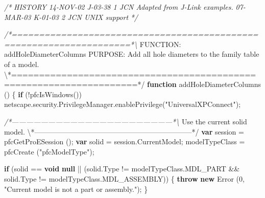 \documentclass[]{article}
\newenvironment{Shaded}{}{}
\newcommand{\KeywordTok}[1]{\textcolor[rgb]{0.00,0.44,0.13}{\textbf{{#1}}}}
\newcommand{\DecValTok}[1]{\textcolor[rgb]{0.25,0.63,0.44}{{#1}}}
\newcommand{\StringTok}[1]{\textcolor[rgb]{0.25,0.44,0.63}{{#1}}}
\newcommand{\CommentTok}[1]{\textcolor[rgb]{0.38,0.63,0.69}{\textit{{#1}}}}
\newcommand{\OtherTok}[1]{\textcolor[rgb]{0.00,0.44,0.13}{{#1}}}
\newcommand{\FunctionTok}[1]{\textcolor[rgb]{0.02,0.16,0.49}{{#1}}}
\newcommand{\NormalTok}[1]{{#1}}
\begin{document}
\begin{Shaded}
\begin{Highlighting}[]
\CommentTok{/*}
\CommentTok{   HISTORY}
\CommentTok{   }
\CommentTok{14-NOV-02   J-03-38   $$1   JCN      Adapted from J-Link examples.}
\CommentTok{07-MAR-03   K-01-03   $$2   JCN      UNIX support}
\CommentTok{*/}

\CommentTok{/*====================================================================*\textbackslash{}}
\NormalTok{FUNCTION: addHoleDiameterColumns}
\NormalTok{PURPOSE:  Add all hole diameters to the family table of a }\OtherTok{model}\NormalTok{.}
\NormalTok{\textbackslash{}*====================================================================*}\OtherTok{/}
\KeywordTok{function} \FunctionTok{addHoleDiameterColumns} \NormalTok{()}
\NormalTok{\{}
  \KeywordTok{if} \NormalTok{(!}\FunctionTok{pfcIsWindows}\NormalTok{())}
    \OtherTok{netscape}\NormalTok{.}\OtherTok{security}\NormalTok{.}\OtherTok{PrivilegeManager}\NormalTok{.}\FunctionTok{enablePrivilege}\NormalTok{(}\StringTok{"UniversalXPConnect"}\NormalTok{);}
  
\CommentTok{/*------------------------------------------------------------------*\textbackslash{}}
  \NormalTok{Use the current solid }\OtherTok{model}\NormalTok{.}
\NormalTok{\textbackslash{}*------------------------------------------------------------------*}\OtherTok{/}
  \KeywordTok{var} \NormalTok{session = }\FunctionTok{pfcGetProESession} \NormalTok{();}
  \KeywordTok{var} \NormalTok{solid = }\OtherTok{session}\NormalTok{.}\FunctionTok{CurrentModel}\NormalTok{;}
  \NormalTok{modelTypeClass = }\FunctionTok{pfcCreate} \NormalTok{(}\StringTok{"pfcModelType"}\NormalTok{);}
  
  \KeywordTok{if} \NormalTok{(solid == }\KeywordTok{void} \KeywordTok{null} \NormalTok{|| (}\OtherTok{solid}\NormalTok{.}\FunctionTok{Type} \NormalTok{!= }\OtherTok{modelTypeClass}\NormalTok{.}\FunctionTok{MDL_PART} \NormalTok{&& }
                 \OtherTok{solid}\NormalTok{.}\FunctionTok{Type} \NormalTok{!= }\OtherTok{modelTypeClass}\NormalTok{.}\FunctionTok{MDL_ASSEMBLY}\NormalTok{))}
    \NormalTok{\{}
      \KeywordTok{throw} \KeywordTok{new} \FunctionTok{Error}  \NormalTok{(}\DecValTok{0}\NormalTok{, }\StringTok{"Current model is not a part or assembly."}\NormalTok{);}
    \NormalTok{\}}
     

\end{Highlighting}
\end{Shaded}
\end{document}
